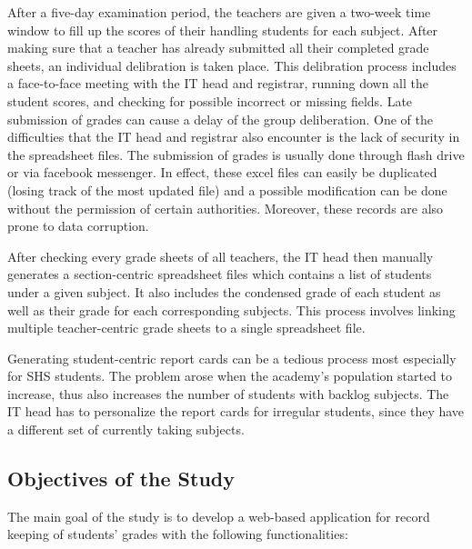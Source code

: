 \documentclass[11pt,a4paper,titlepage]{article}
\begin{document}
After a five-day examination period, the teachers are given a two-week time window to fill up the scores of their handling students for each subject. After making sure that a teacher has already submitted all their completed grade sheets, an individual delibration is taken place. This delibration process includes a face-to-face meeting with the IT head and registrar, running down all the student scores, and checking for possible incorrect or missing fields. Late submission of grades can cause a delay of the group deliberation.   
One of the difficulties that the IT head and registrar also encounter is the lack of security in the spreadsheet files. The submission of grades is usually done through flash drive or via facebook messenger. In effect, these excel files can easily be duplicated (losing track of the most updated file) and a possible modification can be done without the permission of certain authorities. Moreover, these records are also prone to data corruption.

 After checking every grade sheets of all teachers, the IT head then manually generates a section-centric spreadsheet files which contains a list of students under a given subject. It also includes the condensed grade of each student as well as their grade for each corresponding subjects. This process involves linking multiple teacher-centric grade sheets to a single spreadsheet file. 

Generating student-centric report cards can be a tedious process most especially for SHS students. The problem arose when the academy's population started to increase, thus also increases the number of students with backlog subjects. The IT head has to personalize the report cards for irregular students, since they have a different set of currently taking subjects.  






\subsection{Objectives of the Study}
The main goal of the study is to develop a web-based application for record keeping of students' grades with the following functionalities:
\end{document}
